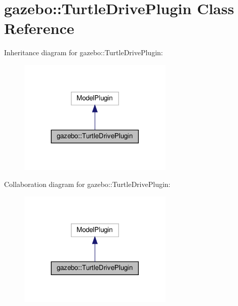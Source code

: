 \hypertarget{classgazebo_1_1TurtleDrivePlugin}{}\section{gazebo\+:\+:Turtle\+Drive\+Plugin Class Reference}
\label{classgazebo_1_1TurtleDrivePlugin}


Inheritance diagram for gazebo\+:\+:Turtle\+Drive\+Plugin\+:
\nopagebreak
\begin{figure}[H]
\begin{center}
\leavevmode
\includegraphics[width=209pt]{d6/d21/classgazebo_1_1TurtleDrivePlugin__inherit__graph}
\end{center}
\end{figure}


Collaboration diagram for gazebo\+:\+:Turtle\+Drive\+Plugin\+:
\nopagebreak
\begin{figure}[H]
\begin{center}
\leavevmode
\includegraphics[width=209pt]{da/d2c/classgazebo_1_1TurtleDrivePlugin__coll__graph}
\end{center}
\end{figure}
